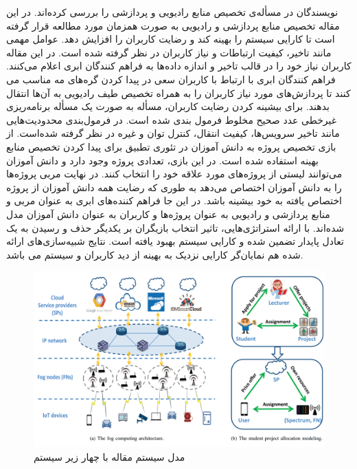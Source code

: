     نویسندگان در \cite{gu2018joint} مسأله‌ی تخصیص منابع رادیویی و پردازشی را بررسی کرده‌اند.
    در این مقاله تخصیص منابع پردازشی و رادیویی به صورت همزمان مورد مطالعه قرار گرفته است تا کارایی سیستم را بهینه کند و رضایت کاربران را افزایش دهد.
    عوامل مهمی مانند تاخیر، کیفیت ارتباطات و نیاز کاربران در نظر گرفته شده است.
    در این مقاله کاربران نیاز خود را در قالب تاخیر و اندازه داده‌ها به فراهم کنندگان ابری اعلام می‌کنند.
    فراهم کنندگان ابری با ارتباط با کاربران سعی در پیدا کردن گره‌های  مه مناسب می کنند تا پردازش‌های مورد نیاز کاربران را به همراه تخصیص طیف رادیویی به آن‌ها انتقال بدهند.
    برای بیشینه کردن رضایت کاربران، مسأله به صورت یک مسأله برنامه‌ریزی غیرخطی عدد صحیح مخلوط فرمول بندی شده است.
    در فرمول‌بندی محدودیت‌هایی مانند تاخیر سرویس‌ها، کیفیت انتقال، کنترل توان و غیره در نظر گرفته شده‌است.
    از بازی تخصیص پروژه به دانش آموزان در تئوری تطبیق برای پیدا کردن تخصیص منابع بهینه استفاده شده است.
    در این بازی، تعدادی پروژه وجود دارد و دانش آموزان می‌توانند لیستی از پروژه‌های مورد علاقه خود را انتخاب کنند.
    در نهایت مربی پروژه‌ها را به دانش آموزان اختصاص می‌دهد به طوری که رضایت همه دانش آموزان از پروژه اختصاص یافته به خود بیشینه باشد.
    در این جا فراهم کننده‌های ابری به عنوان مربی و منابع پردازشی و رادیویی به عنوان پروژه‌ها و کاربران به عنوان دانش آموزان مدل شده‌اند.
    با ارائه استراتژی‌هایی، تاثیر انتخاب بازیگران بر یکدیگر حذف و رسیدن به یک تعادل پایدار تضمین شده و کارایی سیستم بهبود یافته است.
    نتایج شبیه‌سازی‌های ارائه شده هم نمایان‌گر کارایی نزدیک به بهینه از دید کاربران و سیستم می باشد.

    \begin{figure}[h]
      \centerline{\includegraphics[width=12cm]{graphics/chapter_2/system_model_gu2018joint}}
      \caption{مدل سیستم مقاله \cite{gu2018joint} با چهار زیر سیستم}
      \label{fig:chapter_2:system_model_gu2018joint}
    \end{figure}
